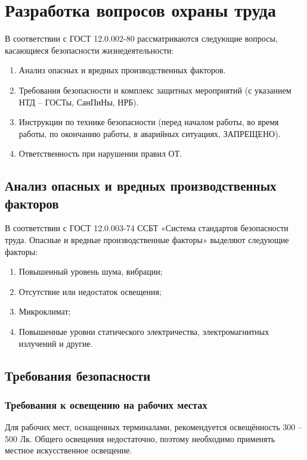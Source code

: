 \newpage
{}
\section{Разработка вопросов охраны труда}
\setcounter{table}{0}

В соответствии с ГОСТ 12.0.002-80 рассматриваются следующие вопросы, касающиеся безопасности жизнедеятельности:

\begin{enumerate}
 \item Анализ опасных и вредных производственных факторов.
 \item Требования безопасности и комплекс защитных мероприятий (с указанием НТД – ГОСТы, СанПиНы, НРБ).
 \item Инструкции по технике безопасности (перед началом работы, во время работы, по окончанию работы, в аварийных ситуациях, ЗАПРЕЩЕНО).
 \item Ответственность при нарушении правил ОТ. 
\end{enumerate}

\subsection{Анализ опасных и вредных производственных факторов}

В соответствии с ГОСТ 12.0.003-74 ССБТ «Система стандартов безопасности труда. Опасные и вредные производственные факторы» выделяют следующие факторы:

\begin{enumerate}
 \item Повышенный уровень шума, вибрации;
 \item Отсутствие или недостаток освещения;
 \item Микроклимат;
 \item Повышенные уровни статического электричества, электромагнитных излучений и другие.
\end{enumerate}

\subsection{Требования безопасности}

\subsubsection{Требования к освещению на рабочих местах}

Для рабочих мест, оснащенных терминалами, рекомендуется освещённость 300 – 500 Лк. Общего освещения недостаточно, поэтому необходимо применять местное искусственное освещение\cite{OT1}.

